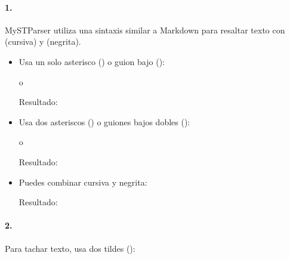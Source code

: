 \documentclass[a4paper,10pt,oneside,spanish,openany]{sphinxmanual}
\begin{document}
\paragraph{1. }
\label{\detokenize{configuracion_inicial/013.guia_de_myst_parser:enfasis-de-texto}}
\sphinxAtStartPar
MyST\sphinxhyphen{}Parser utiliza una sintaxis similar a Markdown para resaltar texto con  (cursiva) y  (negrita).
\begin{itemize}
\item {} 
\sphinxAtStartPar
{} Usa un solo asterisco (\sphinxcode{\sphinxupquote{*}}) o guion bajo (\sphinxcode{\sphinxupquote{\_}}):

\begin{sphinxVerbatim}[commandchars=\\\{\}]
 o 
\end{sphinxVerbatim}

\sphinxAtStartPar
Resultado: 

\item {} 
\sphinxAtStartPar
{} Usa dos asteriscos (\sphinxcode{\sphinxupquote{**}}) o guiones bajos dobles (\sphinxcode{\sphinxupquote{\_\_}}):

\begin{sphinxVerbatim}[commandchars=\\\{\}]
 o 
\end{sphinxVerbatim}

\sphinxAtStartPar
Resultado: 

\item {} 
\sphinxAtStartPar
{} Puedes combinar cursiva y negrita:

\begin{sphinxVerbatim}[commandchars=\\\{\}]
\end{sphinxVerbatim}

\sphinxAtStartPar
Resultado: 

\end{itemize}


\paragraph{2. }
\label{\detokenize{configuracion_inicial/013.guia_de_myst_parser:texto-tachado}}
\sphinxAtStartPar
Para tachar texto, usa dos tildes (\sphinxcode{\sphinxupquote{\textasciitilde{}\textasciitilde{}}}):
\end{document}

